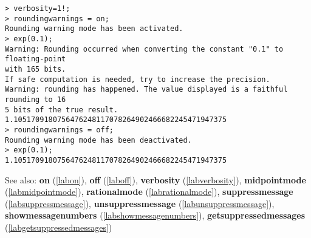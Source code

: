 \begin{center}\begin{minipage}{15cm}\begin{Verbatim}[frame=single,commandchars=\\\|\~]
> verbosity=1!;
> roundingwarnings = on;
Rounding warning mode has been activated.
> exp(0.1);
Warning: Rounding occurred when converting the constant "0.1" to floating-point 
with 165 bits.
If safe computation is needed, try to increase the precision.
Warning: rounding has happened. The value displayed is a faithful rounding to 16
5 bits of the true result.
1.1051709180756476248117078264902466682245471947375
> roundingwarnings = off;
Rounding warning mode has been deactivated.
> exp(0.1);
1.1051709180756476248117078264902466682245471947375
\end{Verbatim}
\end{minipage}\end{center}
See also: \textbf{on} (\ref{labon}), \textbf{off} (\ref{laboff}), \textbf{verbosity} (\ref{labverbosity}), \textbf{midpointmode} (\ref{labmidpointmode}), \textbf{rationalmode} (\ref{labrationalmode}), \textbf{suppressmessage} (\ref{labsuppressmessage}), \textbf{unsuppressmessage} (\ref{labunsuppressmessage}), \textbf{showmessagenumbers} (\ref{labshowmessagenumbers}), \textbf{getsuppressedmessages} (\ref{labgetsuppressedmessages})
